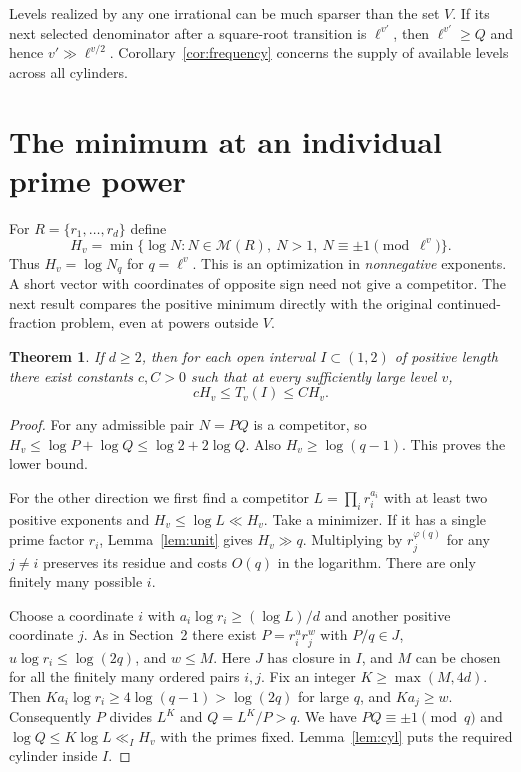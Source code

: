 \documentclass[11pt]{article}
\newtheorem{theorem}{Theorem}[section]
\newcommand{\M}{\mathcal M}
\begin{document}
Levels realized by any one irrational can be much sparser than the set
$V$. If its next selected denominator after a square-root transition is
$\ell^{v'}$, then $\ell^{v'}\ge Q$ and hence
$v'\gg\ell^{v/2}$. Corollary~\ref{cor:frequency} concerns the supply
of available levels across all cylinders.

\section{The minimum at an individual prime power}\label{sec:min}
For $R=\{r_1,\ldots,r_d\}$ define
\[
 H_v=\min\{\log N:N\in\M(R),\ N>1,\ N\equiv\pm1\pmod{\ell^v}\}.
\]
Thus $H_v=\log N_q$ for $q=\ell^v$. This is an optimization in
\emph{nonnegative} exponents. A short vector
with coordinates of opposite sign need not give a competitor. The next
result compares the positive minimum directly with the original
continued-fraction problem, even at powers outside $V$.

\begin{theorem}\label{th:transfer}
If $d\ge2$, then for each open interval $I\subset(1,2)$ of positive
length there exist constants $c,C>0$ such that at every sufficiently
large level $v$,
\[
                           c H_v\le T_v(I)\le C H_v .
\]
\end{theorem}
\begin{proof}
For any admissible pair $N=P Q$ is a competitor, so
$H_v\le\log P+\log Q\le\log 2+2\log Q$. Also $H_v\ge\log(q-1)$.
This proves the lower bound.

For the other direction we first find a competitor
$L=\prod_i r_i^{a_i}$ with at least two positive exponents and
$H_v\le\log L\ll H_v$. Take a minimizer. If it has a single prime
factor $r_i$, Lemma~\ref{lem:unit} gives $H_v\gg q$. Multiplying by
$r_j^{\varphi(q)}$ for any $j\ne i$ preserves its residue and costs
$O(q)$ in the logarithm. There are only finitely many possible $i$.

Choose a coordinate $i$ with $a_i\log r_i\ge(\log L)/d$ and another
positive coordinate $j$. As in Section~2 there exist
$P=r_i^u r_j^w$ with $P/q\in J$, $u\log r_i\le\log(2q)$, and $w\le M$.
Here $J$ has closure in $I$, and $M$ can be chosen for all the finitely
many ordered pairs $i,j$. Fix an integer $K\ge\max(M,4d)$. Then
$Ka_i\log r_i\ge4\log(q-1)>\log(2q)$ for large $q$, and $Ka_j\ge w$.
Consequently $P$ divides $L^K$ and $Q=L^K/P>q$. We have
$P Q\equiv\pm1\pmod q$ and $\log Q\le K\log L\ll_I H_v$ with the
primes fixed. Lemma~\ref{lem:cyl} puts the required cylinder inside $I$.
\end{proof}
\end{document}
